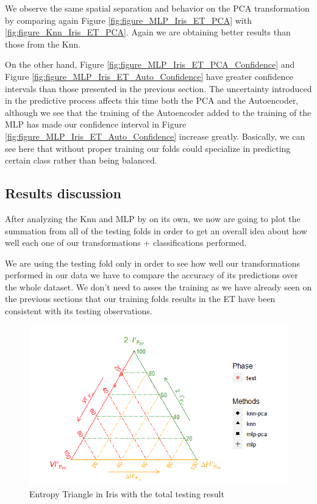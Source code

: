We observe the same spatial separation and behavior on the PCA transformation by comparing again Figure \ref{fig:figure_MLP_Iris_ET_PCA} with \ref{fig:figure_Knn_Iris_ET_PCA}. Again we are obtaining better results than those from the Knn. \par

On the other hand, Figure \ref{fig:figure_MLP_Iris_ET_PCA_Confidence} and Figure \ref{fig:figure_MLP_Iris_ET_Auto_Confidence} have greater confidence intervals than those presented in the previous section. The uncertainty introduced in the predictive process affects this time both the PCA and the Autoencoder, although we see that the training of the Autoencoder added to the training of the MLP has made our confidence interval in Figure \ref{fig:figure_MLP_Iris_ET_Auto_Confidence} increase greatly. Basically, we can see here that without proper training our folds could specialize in predicting certain class rather than being balanced.
 
\subsection{Results discussion} 

After analyzing the Knn and MLP by on its own, we now are going to plot the summation from all of the testing folds in order to get an overall idea about how well each one of our transformations + classifications performed.\par                 

We are using the testing fold only in order to see how well our transformations performed in our data we have to compare the accuracy of its predictions over the whole dataset. We don't need to asses the training as we have already seen on the previous sections that our training folds results in the ET have been consistent with its testing observations. \par

\begin{figure}[H]
	\includegraphics[width=1\linewidth]{Figuras_tfg/ET_Iris_Total_Results}
	\caption{Entropy Triangle in Iris with the total testing result}
	\label{fig:figure_ET_Total_Testing_Iris}
\end{figure}

